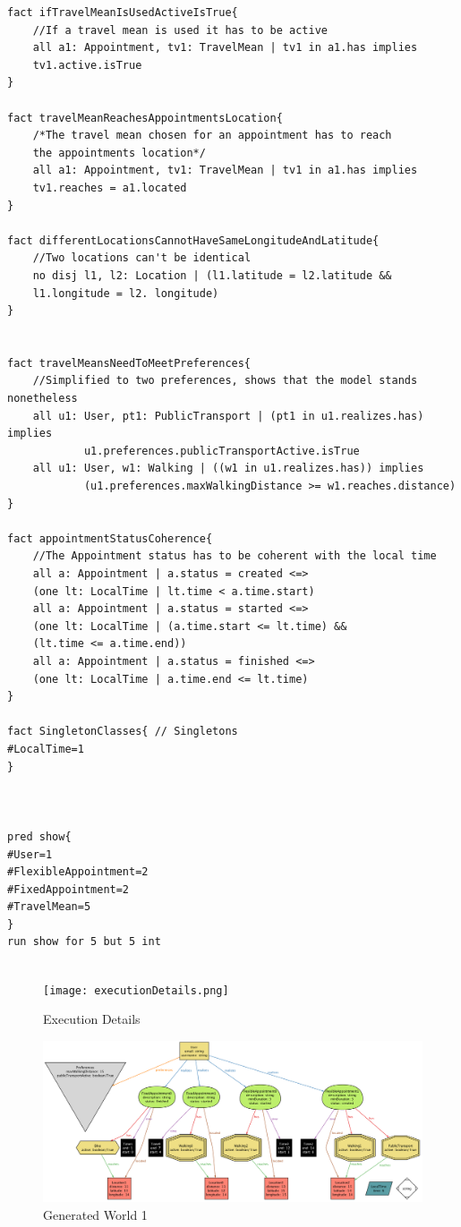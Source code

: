 \documentclass[12pt]{article}
\begin{document}
\begin{verbatim}
fact ifTravelMeanIsUsedActiveIsTrue{
    //If a travel mean is used it has to be active
    all a1: Appointment, tv1: TravelMean | tv1 in a1.has implies 
    tv1.active.isTrue 
}

fact travelMeanReachesAppointmentsLocation{
    /*The travel mean chosen for an appointment has to reach 
    the appointments location*/
    all a1: Appointment, tv1: TravelMean | tv1 in a1.has implies 
    tv1.reaches = a1.located 
}

fact differentLocationsCannotHaveSameLongitudeAndLatitude{
    //Two locations can't be identical 
    no disj l1, l2: Location | (l1.latitude = l2.latitude && 
    l1.longitude = l2. longitude)
}


fact travelMeansNeedToMeetPreferences{
    //Simplified to two preferences, shows that the model stands nonetheless
    all u1: User, pt1: PublicTransport | (pt1 in u1.realizes.has) implies 
            u1.preferences.publicTransportActive.isTrue
    all u1: User, w1: Walking | ((w1 in u1.realizes.has)) implies 
            (u1.preferences.maxWalkingDistance >= w1.reaches.distance)
}

fact appointmentStatusCoherence{
    //The Appointment status has to be coherent with the local time
    all a: Appointment | a.status = created <=> 
    (one lt: LocalTime | lt.time < a.time.start)
    all a: Appointment | a.status = started <=> 
    (one lt: LocalTime | (a.time.start <= lt.time) && 
    (lt.time <= a.time.end))
    all a: Appointment | a.status = finished <=> 
    (one lt: LocalTime | a.time.end <= lt.time)
}

fact SingletonClasses{ // Singletons
#LocalTime=1
}



pred show{
#User=1
#FlexibleAppointment=2
#FixedAppointment=2
#TravelMean=5
}
run show for 5 but 5 int


\end{verbatim}

\begin{figure}[H]
        \texttt{[image: executionDetails.png]}
        \centering
        \caption{Execution Details}
    \label{fig:execDetail}
\end{figure}

\begin{figure}[H]
        \includegraphics[scale=0.41, angle=-90, origin=c]{generatedWorld1.png}
        \centering
        \caption{Generated World 1}
    \label{fig:execDetail}
\end{figure}
\end{document}
